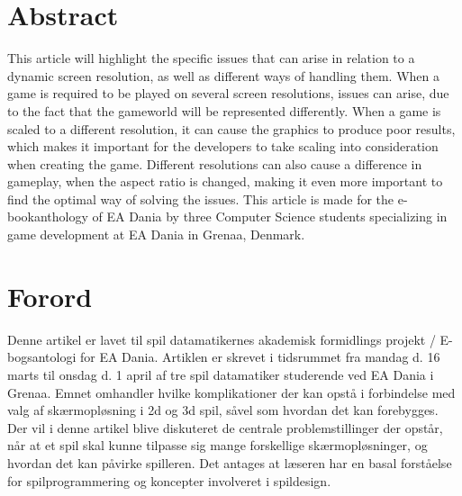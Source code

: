 



	\maketitle
		
\chapter*{Abstract}
This article will highlight the specific issues that can arise in relation to a dynamic screen resolution, as well as different ways of handling them.
When a game is required to be played on several screen resolutions, issues can arise, due to the fact that the gameworld will be represented differently. When a game is scaled to a different resolution, it can cause the graphics to produce poor results, which makes it important for the developers to take scaling into consideration when creating the game. Different resolutions can also cause a difference in gameplay, when the aspect ratio is changed, making it even more important to find the optimal way of solving the issues.
This article is made for the e-bookanthology of EA Dania by three Computer Science students specializing in game development at EA Dania in Grenaa, Denmark.

\chapter*{Forord}
Denne artikel er lavet til spil datamatikernes akademisk formidlings projekt / E-bogsantologi for EA Dania. Artiklen er skrevet i tidsrummet fra mandag d. 16 marts til onsdag d. 1 april af tre spil datamatiker studerende ved EA Dania i Grenaa.
Emnet omhandler hvilke komplikationer der kan opstå i forbindelse med valg af skærmopløsning i 2d og 3d spil, såvel som hvordan det kan forebygges. Der vil i denne artikel blive diskuteret de centrale problemstillinger der opstår, når at et spil skal kunne tilpasse sig mange forskellige skærmopløsninger, og hvordan det kan påvirke spilleren. 
Det antages at læseren har en basal forståelse for spilprogrammering og koncepter involveret i spildesign.


	\newpage
		\pagestyle{fancy}
		\lhead{} \chead{} \rhead{} \lfoot{} \cfoot{} \rfoot{} 	
	
	\tableofcontents
	
	
	\newpage	
	\pagestyle{fancy}
		\lhead{}
		\renewcommand{\headrulewidth}{0.4pt}
		\renewcommand{\footrulewidth}{0.4pt}
	
	\setcounter{page}{1}	
		
		
		
		\clearpage	
		
		

		\clearpage	
	
		
		
		\clearpage		
			
		
		
		\clearpage
		
	\printbibliography


